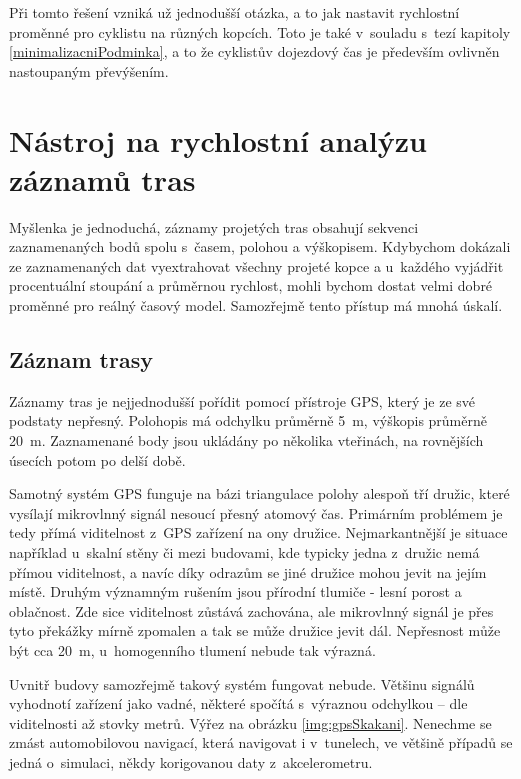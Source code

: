 \documentclass[thesis=B,czech]{FITthesis}[2012/06/26]
\begin{document}
Při tomto řešení vzniká už jednodušší otázka, a to jak nastavit rychlostní proměnné pro cyklistu na různých kopcích. Toto je také v~souladu s~tezí kapitoly \ref{minimalizacniPodminka}, a to že cyklistův dojezdový čas je především ovlivněn nastoupaným převýšením.

\section{Nástroj na rychlostní analýzu záznamů tras}
Myšlenka je jednoduchá, záznamy projetých tras obsahují sekvenci zaznamenaných bodů spolu s~časem, polohou a výškopisem. Kdybychom dokázali ze zaznamenaných dat vyextrahovat všechny projeté kopce a u~každého vyjádřit procentuální stoupání a průměrnou rychlost, mohli bychom dostat velmi dobré proměnné pro reálný časový model. Samozřejmě tento přístup má mnohá úskalí. 

\subsection{Záznam trasy}
\label{zaznamTrasy}
Záznamy tras je nejjednodušší pořídit pomocí přístroje GPS, který je ze své podstaty nepřesný. Polohopis má odchylku průměrně 5~m, výškopis průměrně 20~m. Zaznamenané body jsou ukládány po několika vteřinách, na rovnějších úsecích potom po delší době. 

Samotný systém GPS funguje na bázi triangulace polohy alespoň tří družic, které vysílají mikrovlnný signál nesoucí přesný atomový čas. Primárním problémem je tedy přímá viditelnost z~GPS zařízení na ony družice. Nejmarkantnější je situace například u~skalní stěny či mezi budovami, kde typicky jedna z~družic nemá přímou viditelnost, a navíc díky odrazům se jiné družice mohou jevit na jejím místě. Druhým významným rušením jsou přírodní tlumiče - lesní porost a oblačnost. Zde sice viditelnost zůstává zachována, ale mikrovlnný signál je přes tyto překážky mírně zpomalen a tak se může družice jevit dál. Nepřesnost může být cca 20~m, u~homogenního tlumení nebude tak výrazná.

Uvnitř budovy samozřejmě takový systém fungovat nebude. Většinu signálů vyhodnotí zařízení jako vadné, některé spočítá s~výraznou odchylkou -- dle viditelnosti až stovky metrů. Výřez na obrázku \ref{img:gpsSkakani}. Nenechme se zmást automobilovou navigací, která  navigovat i v~tunelech, ve většině případů se jedná o~simulaci, někdy korigovanou daty z~akcelerometru.
\end{document}
